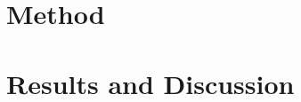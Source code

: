 \documentclass{article}
\begin{document}
\section{Method}


\section{Results and Discussion}






\end{document}
